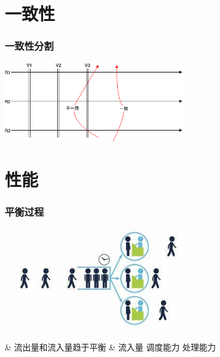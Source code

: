 \documentclass[UTF8,8pt,xcolor=dvipsnames]{beamer}
\newenvironment{myeasylist}[1]{
    \Activate
    \begin{tcolorbox}
    \begin{easylist}[#1]
} {
    \end{easylist}
    \end{tcolorbox}
    \Deactivate
}
\begin{document}
\section{一致性}

\begin{frame}[fragile]
    \frametitle{一致性分割}
    \begin{center}
        \includegraphics[width=0.6\textwidth]{../imgs/consistency-splice.png}
    \end{center}
\end{frame}

\section{性能}

\begin{frame}[fragile]
    \frametitle{平衡过程}
    \begin{center}
        \includegraphics[width=0.6\textwidth]{../imgs/queuing.jpeg}
    \end{center}

    \begin{myeasylist}{itemize}
        & 流出量和流入量趋于平衡
        & 流入量  调度能力  处理能力
    \end{myeasylist}
\end{frame}
\end{document}
